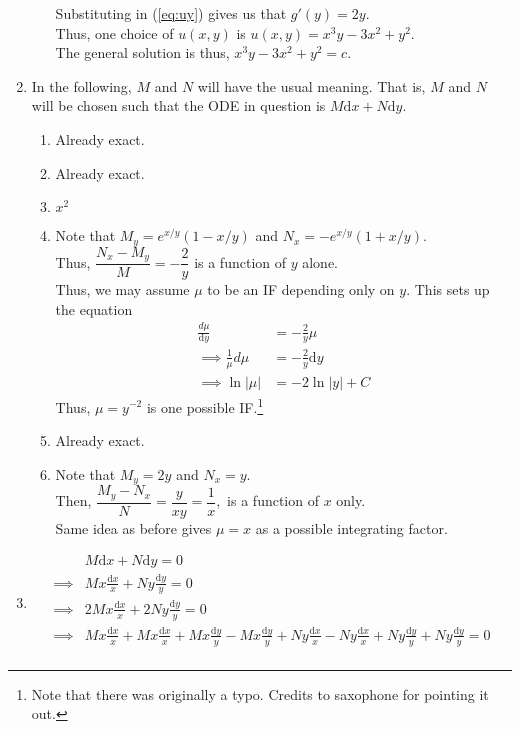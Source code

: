 \documentclass[12pt]{article}
\theoremstyle{definition}
\numberwithin{thm}{section}
\newcommand{\dd}{{\mathrm d}}
\begin{document}
\begin{enumerate}[leftmargin=*, label = Q.\arabic*.]
\begin{enumerate}[label = (\roman*)]
		Substituting in (\ref{eq:uy}) gives us that $g'(y) = 2y.$\\
		Thus, one choice of $u(x, y)$ is $u(x, y) = x^3y - 3x^2 + y^2.$\\
		The general solution is thus, $x^3y - 3x^2 + y^2 = c.$
	\end{enumerate}
	\item In the following, $M$ and $N$ will have the usual meaning. That is, $M$ and $N$ will be chosen such that the ODE in question is $M\dd x + N\dd y.$
	\begin{enumerate}[label = (\roman*)] 
		\item Already exact.
		\item Already exact.
		\item $x^2$
		\item Note that $M_y = e^{x/y}(1 - x/y)$ and $N_x = -e^{x/y}(1 + x/y).$\\
		Thus, $\dfrac{N_x - M_y}{M} = -\dfrac{2}{y}$ is a function of $y$ alone.\\
		Thus, we may assume $\mu$ to be an IF depending only on $y.$ This sets up the equation
		\begin{align*} 
			\frac{d\mu}{\dd y} &= -\frac{2}{y}\mu\\
			\implies \frac{1}{\mu}d\mu &= -\frac{2}{y}\dd y\\
			\implies \ln|\mu| &= -2\ln|y| + C
		\end{align*}
		Thus, $\mu = y^{-2}$ is one possible IF.\footnote{Note that there was originally a typo. Credits to saxophone for pointing it out.}\\
		\item Already exact.
		\item Note that $M_y = 2y$ and $N_x = y.$\\
		Then, $\dfrac{M_y - N_x}{N} = \dfrac{y}{xy} = \dfrac{1}{x},$ is a function of $x$ only.\\
		Same idea as before gives $\mu = x$ as a possible integrating factor.
	\end{enumerate}
	\item \begin{align*} 
		& M\dd x + N\dd y = 0\\
		\implies & Mx\frac{\dd x}{x} + Ny\frac{\dd y}{y} = 0\\
		\implies & 2Mx\frac{\dd x}{x} + 2Ny\frac{\dd y}{y} = 0\\
		\implies & Mx\frac{\dd x}{x} + Mx\frac{\dd x}{x} + Mx\frac{\dd y}{y} - Mx\frac{\dd y}{y} + Ny\frac{\dd x}{x} - Ny\frac{\dd x}{x} + Ny\frac{\dd y}{y} + Ny\frac{\dd y}{y} = 0\\

\end{align*}
\end{enumerate}
\end{document}
